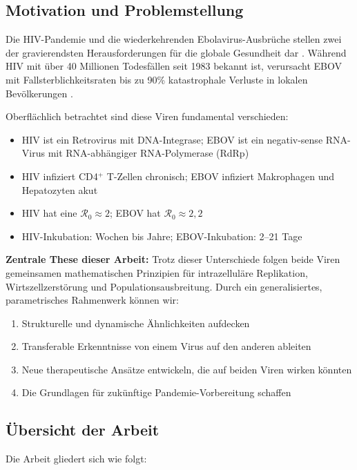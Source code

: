 ﻿\documentclass[a4paper,12pt]{article}
\theoremstyle{definition}
\begin{document}
\subsection{Motivation und Problemstellung}

Die HIV-Pandemie und die wiederkehrenden Ebolavirus-Ausbrüche stellen zwei der gravierendsten Herausforderungen für die globale Gesundheit dar \cite{bekker2023hiv, johnson2023ebola}. Während HIV mit über 40 Millionen Todesfällen seit 1983 bekannt ist, verursacht EBOV mit Fallsterblichkeitsraten bis zu 90\% katastrophale Verluste in lokalen Bevölkerungen \cite{who2016report}.

Oberflächlich betrachtet sind diese Viren fundamental verschieden:
\begin{itemize}
\item HIV ist ein Retrovirus mit DNA-Integrase; EBOV ist ein negativ-sense RNA-Virus mit RNA-abhängiger RNA-Polymerase (RdRp)
\item HIV infiziert CD4$^+$ T-Zellen chronisch; EBOV infiziert Makrophagen und Hepatozyten akut
\item HIV hat eine $\mathcal{R}_0 \approx 2$; EBOV hat $\mathcal{R}_0 \approx 2,2$ 
\item HIV-Inkubation: Wochen bis Jahre; EBOV-Inkubation: 2--21 Tage
\end{itemize}

\textbf{Zentrale These dieser Arbeit:} Trotz dieser Unterschiede folgen beide Viren gemeinsamen mathematischen Prinzipien für intrazelluläre Replikation, Wirtszellzerstörung und Populationsausbreitung. Durch ein generalisiertes, parametrisches Rahmenwerk können wir:

\begin{enumerate}
\item Strukturelle und dynamische Ähnlichkeiten aufdecken
\item Transferable Erkenntnisse von einem Virus auf den anderen ableiten
\item Neue therapeutische Ansätze entwickeln, die auf beiden Viren wirken könnten
\item Die Grundlagen für zukünftige Pandemie-Vorbereitung schaffen
\end{enumerate}

\subsection{Übersicht der Arbeit}

Die Arbeit gliedert sich wie folgt:
\end{document}

